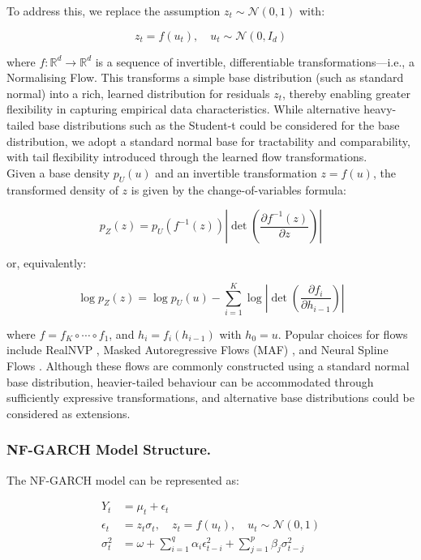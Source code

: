 \documentclass[oneside,12pt]{CUEDthesisPSnPDF}
\newcommand{\parencite}{\citep}
\begin{document}
To address this, we replace the assumption \( z_t \sim \mathcal{N}(0,1) \) with:

\[
z_t = f(u_t), \quad u_t \sim \mathcal{N}(0, I_d)
\]

where \( f: \mathbb{R}^d \rightarrow \mathbb{R}^d \) is a sequence of invertible, differentiable transformations—i.e., a Normalising Flow. This transforms a simple base distribution (such as standard normal) into a rich, learned distribution for residuals \( z_t \), thereby enabling greater flexibility in capturing empirical data characteristics. While alternative heavy-tailed base distributions such as the Student-t could be considered for the base distribution, we adopt a standard normal base for tractability and comparability, with tail flexibility introduced through the learned flow transformations.\\

Given a base density \( p_U(u) \) and an invertible transformation \( z = f(u) \), the transformed density of \( z \) is given by the change-of-variables formula:

\[
p_Z(z) = p_U(f^{-1}(z)) \left| \det \left( \frac{\partial f^{-1}(z)}{\partial z} \right) \right|
\]

or, equivalently:

\[
\log p_Z(z) = \log p_U(u) - \sum_{i=1}^K \log \left| \det \left( \frac{\partial f_i}{\partial h_{i-1}} \right) \right|
\]

where \( f = f_K \circ \cdots \circ f_1 \), and \( h_i = f_i(h_{i-1}) \) with \( h_0 = u \). Popular choices for flows include RealNVP \parencite{dinh2016density}, Masked Autoregressive Flows (MAF) \parencite{papamakarios2017masked}, and Neural Spline Flows \parencite{durkan2019neural}. Although these flows are commonly constructed using a standard normal base distribution, heavier-tailed behaviour can be accommodated through sufficiently expressive transformations, and alternative base distributions could be considered as extensions.\\

\subsubsection{NF-GARCH Model Structure.} The NF-GARCH model can be represented as:

\begin{align}
Y_t &= \mu_t + \epsilon_t \\
\epsilon_t &= z_t \sigma_t, \quad z_t = f(u_t), \quad u_t \sim \mathcal{N}(0,1) \\
\sigma_t^2 &= \omega + \sum_{i=1}^q \alpha_i \epsilon_{t-i}^2 + \sum_{j=1}^p \beta_j \sigma_{t-j}^2
\end{align}
\end{document}
